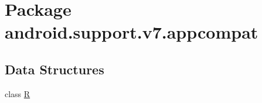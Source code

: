 \hypertarget{namespaceandroid_1_1support_1_1v7_1_1appcompat}{}\section{Package android.\+support.\+v7.\+appcompat}
\label{namespaceandroid_1_1support_1_1v7_1_1appcompat}
\subsection*{Data Structures}
\begin{DoxyCompactItemize}
\item 
class \mbox{\hyperlink{classandroid_1_1support_1_1v7_1_1appcompat_1_1_r}{R}}
\end{DoxyCompactItemize}
